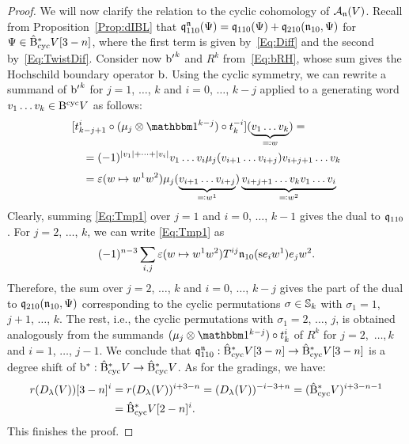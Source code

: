 \documentclass[\MainFolder/Text.tex]{subfiles}
\begin{document}
\begin{proof}
We will now clarify the relation to the cyclic cohomology of $\mathcal{A}_{\mathfrak{n}}(V)$. Recall from Proposition~\ref{Prop:dIBL} that $\mathfrak{q}_{110}^{\mathfrak{n}}(\Psi) = \mathfrak{q}_{110}(\Psi) + \mathfrak{q}_{210}(\mathfrak{n}_{10}, \Psi)$ for $\Psi\in\hat{\mathrm{B}}_{\mathrm{cyc}}^* V[3-n]$, where the first term is given by~\eqref{Eq:Diff} and the second by~\eqref{Eq:TwistDif}. Consider now ${\mathrm{b}'}^k$ and $R^k$ from~\eqref{Eq:bRH}, whose sum gives the Hochschild boundary operator $\mathrm{b}$. Using the cyclic symmetry, we can rewrite a summand of ${\mathrm{b}'}^k$ for $j=1$, $\dotsc$, $k$ and $i=0$, $\dotsc$, $k-j$ applied to a generating word $v_1\dots v_k \in \mathrm{B}^{\mathrm{cyc}} V$ as follows: 
\begin{equation}\label{Eq:Tmp1}
\begin{aligned}
& [t^i_{k-j+1} \circ (\mu_j \otimes \Id^{k-j}) \circ t_k^{-i}](\underbrace{v_1 \dots v_k}_{\eqqcolon w}) = \\
&\quad =(-1)^{\Abs{v_1} + \dotsb + \Abs{v_{i}}} v_1 \dots v_i \mu_j(v_{i+1} \dots v_{i+j})v_{i+j+1} \dots v_k \\[\jot]
&\quad = \varepsilon(w\mapsto w^1 w^2) \mu_j(\underbrace{v_{i+1}\dots v_{i+j}}_{\eqqcolon w^1}) \underbrace{v_{i+j+1} \dots v_k v_1 \dots v_i}_{\eqqcolon w^2}
\end{aligned}
\end{equation}
Clearly, summing \eqref{Eq:Tmp1} over $j=1$ and $i=0$, $\dotsc$, $k-1$ gives the dual to $\mathfrak{q}_{110}$. For $j=2$, $\dotsc$, $k$, we can write \eqref{Eq:Tmp1} as
$$ 
(-1)^{n-3} \sum_{i,j} \varepsilon(w\mapsto w^1 w^2) T^{ij}\mathfrak{n}_{10}(\mathrm{s} e_i w^1) e_j w^2.
$$
Therefore, the sum over $j=2$, $\dotsc$, $k$ and $i=0$, $\dotsc$, $k-j$ gives the part of the dual to $\mathfrak{q}_{210}(\mathfrak{n}_{10},\Psi)$ corresponding to the cyclic permutations $\sigma\in \mathbb{S}_{k}$ with $\sigma_1 = 1$, $j+1$, $\dotsc$, $k$. The rest, i.e., the cyclic permutations with $\sigma_1 = 2$, $\dotsc$, $j$, is obtained analogously from the summands $(\mu_j \otimes \Id^{k-j})\circ t_k^i$ of $R^k$ for $j=2$,~$\dotsc$,\,$k$ and $i=1$, $\dotsc$, $j-1$. We conclude that $\mathfrak{q}_{110}^{\mathfrak{n}}: \hat{\mathrm{B}}_{\mathrm{cyc}}^* V[3-n] \rightarrow \hat{\mathrm{B}}_{\mathrm{cyc}}^* V[3-n]$ is a degree shift of $\mathrm{b}^*: \hat{\mathrm{B}}_{\mathrm{cyc}}^* V \rightarrow \hat{\mathrm{B}}_{\mathrm{cyc}}^* V$. As for the gradings, we have:
$$ \begin{aligned}
r(D_\lambda(V))[3-n]^i &= r(D_\lambda(V))^{i+3-n} = (D_\lambda(V))^{-i-3+n} = (\hat{\mathrm{B}}_{\mathrm{cyc}}^* V)^{i+3-n-1} \\
 &= \hat{\mathrm{B}}_{\mathrm{cyc}}^* V[2-n]^i.
\end{aligned}$$
This finishes the proof.
\end{proof}
\end{document}

